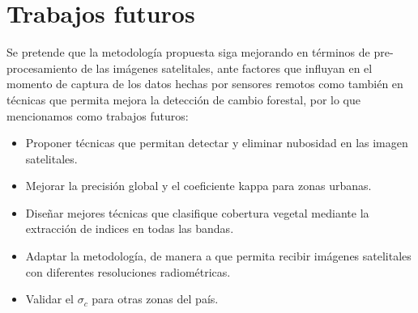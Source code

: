 \section{Trabajos futuros}
Se pretende que la metodolog\'ia propuesta siga mejorando en t\'erminos de pre-procesamiento de las im\'agenes satelitales, ante factores que influyan en el momento de captura de los datos hechas por sensores remotos como tambi\'en en t\'ecnicas que permita mejora la detecci\'on de cambio forestal, por lo que mencionamos como trabajos futuros:
\begin{itemize}
\item Proponer t\'ecnicas que permitan detectar y eliminar nubosidad en las imagen satelitales.
\item Mejorar la precisi\'on global y el coeficiente kappa para zonas urbanas.
\item Dise\~{n}ar mejores t\'ecnicas que clasifique cobertura vegetal mediante la extracci\'on de indices en todas las bandas.
\item Adaptar la metodolog\'ia, de manera a que permita recibir im\'agenes satelitales con diferentes resoluciones radiom\'etricas.
\item Validar el $ \sigma_{c} $ para otras zonas del pa\'is. 

\end{itemize}
